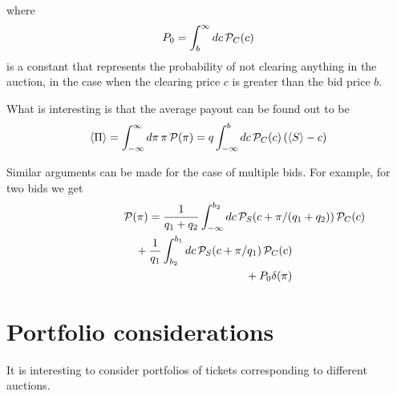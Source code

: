 \documentclass[12pt]{article}
\begin{document}
where $$P_0 = \int_{b}^{\infty}dc\,{\cal P}_C(c) $$ is a constant that
represents the probability of not clearing anything in the auction,
in the case when the clearing price $c$ is greater than the bid
price $b$.




What is interesting is that the average payout can be found out to be 
\begin{equation}
  \langle \Pi \rangle = \int_{-\infty}^{\infty}d\pi\,\pi\,{\cal P}(\pi) 
     = q\int_{-\infty}^{b}dc\,{\cal P}_C(c)\,(\langle S \rangle - c) 
\end{equation}


Similar arguments can be made for the case of multiple bids.  For
example, for two bids we get
\begin{eqnarray*}
  \lefteqn{{\cal P}(\pi) = 
    \frac{1}{q_1+q_2}\int_{-\infty}^{b_2}dc\,{\cal P}_S(c+\pi/(q_1+q_2))\,
       {\cal P}_C(c)} \\ 
  && {} + \frac{1}{q_1}\int_{b_2}^{b_1}dc\,{\cal P}_S(c+\pi/q_1)\, {\cal P}_C(c) \\
  && {} + P_0\delta(\pi) 
\end{eqnarray*}

\section{Portfolio considerations}
It is interesting to consider portfolios of tickets corresponding to
different auctions. 
\end{document}
